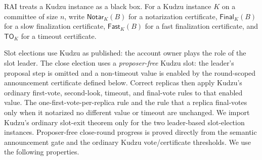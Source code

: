 \documentclass[11pt]{article}
\theoremstyle{definition}
\theoremstyle{remark}
\newcommand{\Notar}{\mathsf{Notar}}
\newcommand{\Final}{\mathsf{Final}}
\newcommand{\Fast}{\mathsf{Fast}}
\newcommand{\TO}{\mathsf{TO}}
\begin{document}
RAI treats a Kudzu instance as a black box. For a Kudzu instance $K$ on a committee of size $n$, write $\Notar_K(B)$ for a notarization certificate, $\Final_K(B)$ for a slow finalization certificate, $\Fast_K(B)$ for a fast finalization certificate, and $\TO_K$ for a timeout certificate.

Slot elections use Kudzu as published: the account owner plays the role of the slot leader. The close election uses a \emph{proposer-free} Kudzu slot: the leader's proposal step is omitted and a non-timeout value is enabled by the round-scoped announcement certificate defined below. Correct replicas then apply Kudzu's ordinary first-vote, second-look, timeout, and final-vote rules to that enabled value. The one-first-vote-per-replica rule and the rule that a replica final-votes only when it notarized no different value or timeout are unchanged. We import Kudzu's ordinary slot-exit theorem only for the two leader-based slot-election instances. Proposer-free close-round progress is proved directly from the semantic announcement gate and the ordinary Kudzu vote/certificate thresholds. We use the following properties.
\end{document}
